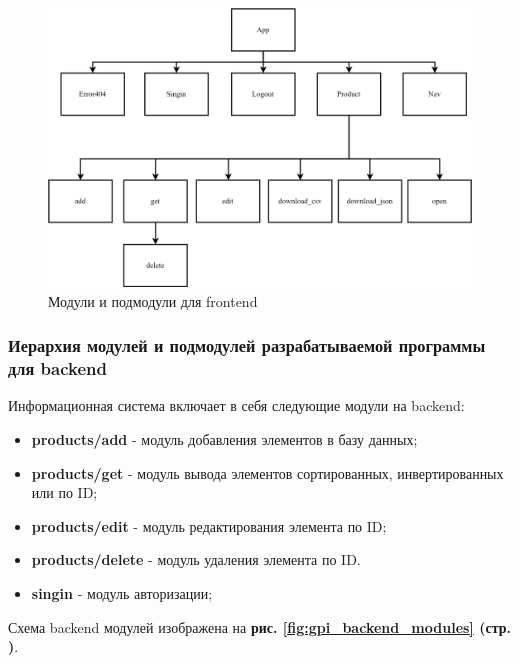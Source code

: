 \begin{figure}[!hp]
    \centering
    \includegraphics[width=16cm]
        {_assets/gpi_frontend_modules.png}
    \caption{Модули и подмодули для frontend}
    \label{fig:gpi_frontend_modules}
\end{figure}

\subsubsection*{Иерархия модулей и подмодулей разрабатываемой программы для backend}

Информационная система включает в себя следующие модули на backend:

\begin{itemize}
    \item \textbf{products/add} - модуль добавления элементов в базу данных;
    \item \textbf{products/get} - модуль вывода элементов сортированных, инвертированных или по ID;
    \item \textbf{products/edit} - модуль редактирования элемента по ID;
    \item \textbf{products/delete} - модуль удаления элемента по ID.
    \item \textbf{singin} - модуль авторизации;
\end{itemize}

Схема backend модулей изображена на
\textbf{рис. \ref{fig:gpi_backend_modules} (стр. \pageref{fig:gpi_backend_modules})}.

